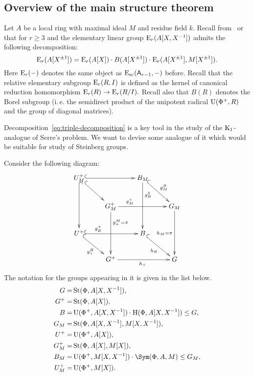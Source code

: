 \subsection{Overview of the main structure theorem} \label{subsec:structure-theorem-overview}
Let $A$ be a local ring with maximal ideal $M$ and residue field $k$.
Recall from~\cite[\S~4]{Su77} or~\cite[\S~VI.6]{Lam10} that for $r \geq 3$ and the elementary linear group $\operatorname{E}_r(A[X, X^{-1}])$ admits the following decomposition:
\begin{equation}\label{eq:triple-decomposition}
\operatorname{E}_r(A[X^{\pm 1}]) = \operatorname{E}_r(A[X]) \cdot B(A[X^{\pm 1}]) \cdot \operatorname{E}_r(A[X^{\pm 1}], M[X^{\pm 1}]).
\end{equation}
Here $\operatorname{E}_r(-)$ denotes the same object as $\operatorname{E}_\mathrm{sc}(\mathsf{A}_{r - 1}, -)$ before.
Recall that the relative elementary subgroup $\operatorname{E}_r(R, I)$ is defined as the kernel of canonical reduction homomorphism $\operatorname{E}_r(R) \to \operatorname{E}_r(R/I).$
Recall also that $B(R)$ denotes the Borel subgroup (i.\,e. the semidirect product of the unipotent radical $\operatorname{U}(\Phi^+, R)$ and the group of diagonal matrices).

Decomposition~\eqref{eq:triple-decomposition} is a key tool in the study of the {$\operatorname{K}_1$-analogue of Serre's problem}.
We want to devise some analogue of it which would be suitable for study of Steinberg groups.

Consider the following diagram:
\[\xymatrix{
    U^+_M \ar@{^{(}->}[rr] \ar@{^{(}->}[dd] \ar@{^{(}->}[rd] &                        & B_M \ar[dd]^(.3){g_B^3} \ar@{^{(}->}[rd]^{g^B_M} &           \\
    & G^+_M \ar[rr]^(.3){g^+_M} \ar^(.3){g^M_+=\pi}[dd] &                   & G_M \ar[dd]_{h_M=\pi} \\
    U^+ \ar@{^{(}->}[rr]^(.3){g_B^+} \ar@{^{(}->}[rd]_{g_+^B}          &                        & B \ar@{^{(}->}[rd]_{h_B}       &           \\
    & G^+ \ar[rr]_{h_+}              &                   & G}\]
The notation for the groups appearing in it is given in the list below.
\begin{align*}
 G     =& \St(\Phi, A[X, X^{-1}]),\\
 G^+   =& \St(\Phi, A[X]),\\
 B     =& \UU(\Phi^+, A[X, X\inv]) \cdot \StH(\Phi, A[X, X\inv]) \leq G,\\
 G_M   =& \St(\Phi, A[X, X^{-1}], M[X, X^{-1}]),\\
 U^+   =& \UU(\Phi^+, A[X]),\\
 G^+_M =& \St(\Phi, A[X], M[X]),\\
 B_M   =& \UU(\Phi^+, M[X, X^{-1}]) \cdot \Sym(\Phi, A, M) \leq G_M,\\
 U^+_M =& \UU(\Phi^+, M[X]).
\end{align*}

